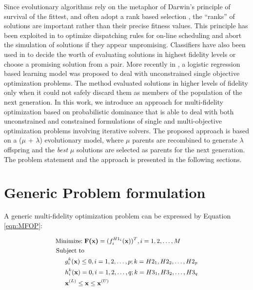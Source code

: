 Since evolutionary algorithms rely on the metaphor of Darwin's principle of survival of the fittest, and often adopt a rank based selection \cite{schimidt2006stat,runarsson04constraint}, the ``ranks'' of solutions are important rather than their precise fitness values. This principle has been exploited in \cite{branke2014hyper} to optimize dispatching rules for on-line scheduling and abort the simulation of solutions if they appear unpromising. Classifiers have also been used in \cite{ziegler2003meta, takahama2008de} to decide the worth of evaluating solutions in highest fidelity levels or choose a promising solution from a pair. More recently in \cite{branke2016par}, a logistic regression based learning model was proposed to deal with unconstrained single objective optimization problems. The method evaluated solutions in higher levels of fidelity only when it could not safely discard them as members of the population of the next generation. In this work, we introduce an approach for multi-fidelity optimization based on probabilistic dominance that is able to deal with both unconstrained and constrained formulations of single and multi-objective optimization problems involving iterative solvers. The proposed approach is based on a ($\mu$ + $\lambda$) evolutionary model, where $\mu$ parents are recombined to generate $\lambda$ offspring and the \textit{best} $\mu$ solutions are selected as parents for the next generation. The problem statement and the approach is presented in the following sections.

\section{Generic Problem formulation}\label{sec:probform}

A generic multi-fidelity optimization problem can be expressed by Equation \ref{eqn:MFOP}:

\begin{equation}\small
\begin{aligned}
\operatorname{Minimize:}\; & \textbf{F(x)} = (f^{H1_i}_i(\textbf{x}))^T, i=1,2,\ldots,M\\
\text{Subject to} & \\
& \hspace{-1cm}g^k_i(\textbf{x})\le 0, i=1,2,\ldots,p; k = H2_1,H2_2,\ldots,H2_p  \\ 
& \hspace{-1cm}h^k_i(\textbf{x}) = 0, i=1,2,\ldots,q; k = H3_1,H3_2,\ldots,H3_q  \\
& \hspace{-1cm}\textbf{x}^{(L)}\le\textbf{x}\le\textbf{x}^{(U)} 
\label{eqn:MFOP}
\end{aligned}
\end{equation}

